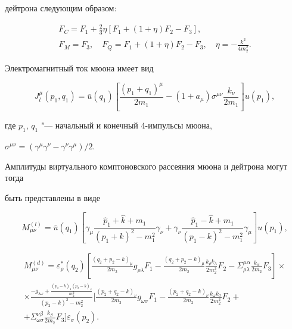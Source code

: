 дейтрона следующим образом:

\begin{gather}

F_C=F_1+\frac{2}{3}\eta\left[F_1+(1+\eta)F_2-F_3\right],

\\

F_M=F_3,\quad 

F_Q=F_1+(1+\eta)F_2-F_3,\quad 

\eta=-\frac{k^2}{4m_2^2}.

\end{gather}

Электромагнитный ток мюона имеет вид

\begin{equation}

J_l^\mu(p_1,q_1)=\bar u(q_1)\left[\frac{(p_1+q_1)^\mu}{2m_1}-(1+a_\mu)

\sigma^{\mu\nu}\frac{k_\nu}{2m_1}\right]u(p_1),

\end{equation}

где $p_1$, $q_1$ "--- начальный и конечный 4-импульсы мюона,

$\sigma^{\mu\nu} = (\gamma^\mu\gamma^\nu-\gamma^\nu\gamma^\mu)/2$.

Амплитуды виртуального комптоновского рассеяния мюона и дейтрона могут тогда

быть представлены в виде~\cite{faustov1}

\begin{equation}

\label{eq:comp1}

M_{\mu\nu}^{(l)}=\bar u(q_1)\left[\gamma_\mu\frac{\hat p_1+\hat k+m_1}

{(p_1+k)^2-m_1^2}\gamma_\nu+\gamma_\nu\frac{\hat p_1-\hat k+m_1}

{(p_1-k)^2-m_1^2}\gamma_\mu\right]u(p_1),

\end{equation}

\begin{multline}

M_{\mu\nu}^{(d)}=\varepsilon^\ast_\rho(q_2)\left[\frac{(q_2+p_2-k)_\mu}

{2m_2}g_{\rho\lambda}F_1-\frac{(q_2+p_2-k)_\mu}{2m_2}\frac{k_\rho k_\lambda}

{2m_2^2}F_2-\Sigma^{\mu\alpha}_{\rho\lambda}\frac{k_\alpha}{2m_2}F_3\right]\times

\\

\label{eq:comp2}

\times\frac{-g_{\lambda\omega}+\frac{(p_2-k)_\lambda(p_2-k)_\omega}{m_2^2}}

{(p_2-k)^2-m_2^2}\Biggl[\frac{(p_2+q_2-k)_\nu}{2m_2}g_{\omega\sigma}F_1-

\frac{(p_2+q_2-k)_\nu}{2m_2}\frac{k_\omega

k_\sigma}{2m_2^2}F_2+

\\

+\Sigma^{\nu\beta}_{\omega\sigma}\frac{k_\beta}{2m_2}F_3\biggr]\varepsilon_\sigma(p_2).

\end{multline}



